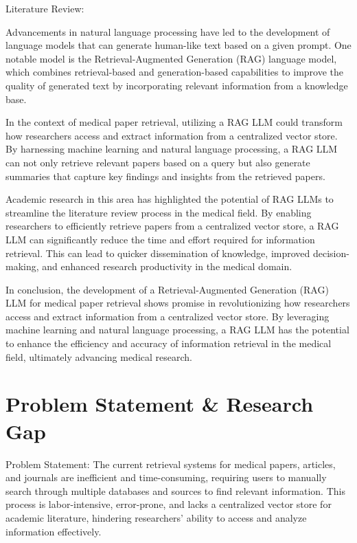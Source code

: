 \documentclass{article}
\begin{document}
Literature Review:

Advancements in natural language processing have led to the development of language models that can generate human-like text based on a given prompt. One notable model is the Retrieval-Augmented Generation (RAG) language model, which combines retrieval-based and generation-based capabilities to improve the quality of generated text by incorporating relevant information from a knowledge base.

In the context of medical paper retrieval, utilizing a RAG LLM could transform how researchers access and extract information from a centralized vector store. By harnessing machine learning and natural language processing, a RAG LLM can not only retrieve relevant papers based on a query but also generate summaries that capture key findings and insights from the retrieved papers.

Academic research in this area has highlighted the potential of RAG LLMs to streamline the literature review process in the medical field. By enabling researchers to efficiently retrieve papers from a centralized vector store, a RAG LLM can significantly reduce the time and effort required for information retrieval. This can lead to quicker dissemination of knowledge, improved decision-making, and enhanced research productivity in the medical domain.

In conclusion, the development of a Retrieval-Augmented Generation (RAG) LLM for medical paper retrieval shows promise in revolutionizing how researchers access and extract information from a centralized vector store. By leveraging machine learning and natural language processing, a RAG LLM has the potential to enhance the efficiency and accuracy of information retrieval in the medical field, ultimately advancing medical research.

\section*{Problem Statement \& Research Gap}
Problem Statement:
The current retrieval systems for medical papers, articles, and journals are inefficient and time-consuming, requiring users to manually search through multiple databases and sources to find relevant information. This process is labor-intensive, error-prone, and lacks a centralized vector store for academic literature, hindering researchers' ability to access and analyze information effectively.
\end{document}
